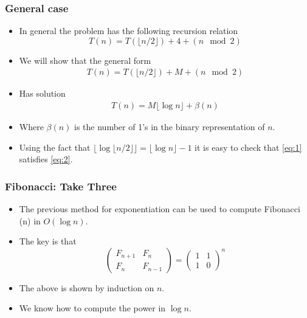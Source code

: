 \documentclass{beamer}
\begin{document}
\begin{frame}
  \frametitle{General case}
  \begin{itemize}
  \item In general the problem has the following recursion relation
    \begin{displaymath}
      T(n)=T(\lfloor n/2\rfloor)+4+ (n\mod 2)
    \end{displaymath}
\item We will show that the general form
  \begin{align}
\label{eq:2}
      T(n)=T(\lfloor n/2\rfloor)+M+ (n\mod 2)
  \end{align}
\item Has solution
  \begin{align}
\label{eq:1}
    T(n)=M\lfloor \log n\rfloor+\beta(n)
  \end{align}
\item Where $\beta(n)$ is the number of 1's in the binary
  representation of $n$.
\item Using the fact that $\lfloor\log\lfloor
  n/2\rfloor\rfloor=\lfloor \log n\rfloor -1$ it is easy to check that
  \eqref{eq:1} satisfies \eqref{eq:2}.
  \end{itemize}
\end{frame}
\begin{frame}
  \frametitle{Fibonacci: Take Three}
  \begin{itemize}
  \item The previous method for exponentiation can be used to compute
    Fibonacci (n) in $O(\log n)$.
 \item The key is that 
   \begin{displaymath}
    \left(
    \begin{array}{cc}
     F_{n+1} & F_n\\
     F_n    & F_{n-1}
    \end{array}
   \right)
   =
     \left(
    \begin{array}{cc}
     1 & 1\\
     1 & 0
    \end{array}
    \right)^n
   \end{displaymath}
  \item The above is shown by induction on $n$.
   \item We know how to compute the power in $\log n$.
  \end{itemize}
\end{frame}
\end{document}
